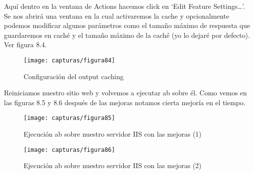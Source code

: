	Aquí dentro en la ventana de Actions hacemos click en ‘Edit Feature Settings…’. Se nos abrirá una ventana en la cual activaremos la cache y opcionalmente podemos modificar algunos parámetros como el tamaño máximo de respuesta que guardaremos en caché y el tamaño máximo de la caché (yo lo dejaré por defecto). Ver figura 8.4. 
	\begin{figure} [H]
	\centering
	\texttt{[image: capturas/figura84]}
	\caption{Configuración del output caching}
	\label{fig:figura84}
	\end{figure}

	Reiniciamos nuestro sitio web y volvemos a ejecutar ab sobre él. Como vemos en las figuras 8.5 y 8.6 después de las mejoras notamos cierta mejoría en el tiempo.
	\begin{figure} [H]
	\centering
	\texttt{[image: capturas/figura85]}
	\caption{Ejecución ab sobre nuestro servidor IIS con las mejoras (1)}
	\label{fig:figura85}
	\end{figure}
	
	\begin{figure} [H]
	\centering
	\texttt{[image: capturas/figura86]}
	\caption{Ejecución ab sobre nuestro servidor IIS con las mejoras (2)}
	\label{fig:figura86}
	\end{figure}

	
